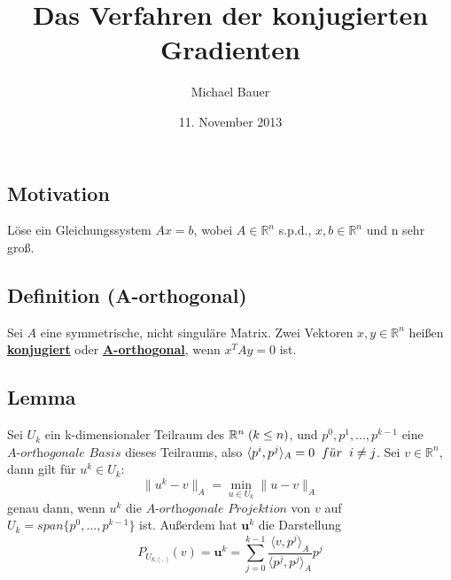 \documentclass{article}
\title{Das Verfahren der konjugierten Gradienten}
\author{Michael Bauer}
\date{11. November 2013}
\begin{document}
\maketitle

\section*{}

\subsection{Motivation}
Löse ein Gleichungssystem $Ax = b$, wobei $A\in\mathbb{R}^{n}$ s.p.d., $x, b\in\mathbb{R}^{n}$ und n sehr groß.

\subsection{Definition (A-orthogonal)}
Sei $A$ eine symmetrische, nicht singuläre Matrix. Zwei Vektoren $x,y \in \mathbb{R}^{n}$ heißen \underline{\textbf{konjugiert}} oder \underline{\textbf{A-orthogonal}}, wenn $x^{T}Ay = 0$ ist.

\subsection{Lemma}
Sei $U_{k}$ ein k-dimensionaler Teilraum des $\mathbb{R}^{n} \hspace{1mm} (k \le n)$, und $p^{0}, p^{1},...,p^{k-1}$ eine $\textit{A-orthogonale Basis}$ dieses Teilraums, also $\langle p^{i}, p^{j} \rangle _{A} = 0 \hspace{2mm} f\ddot{u}r \hspace{2mm} i \ne j$. Sei $v \in \mathbb{R}^{n}$, dann gilt für $u^{k} \in U_{k}$:
\begin{equation}
\|u^{k} - v\|_{A} = \underset{u \in U_{k}}{\min} \|u - v\|_{A}
\end{equation}
genau dann, wenn $u^{k}$ die $\textit{A-orthogonale Projektion}$ von $v$ auf $U_{k} = span\{p^{0},...,p^{k-1}\}$ ist. Außerdem hat $\textbf{u}^{k}$ die Darstellung
\begin{equation}
P_{U_{k,\langle \cdot,\cdot \rangle}}(v) = \textbf{u}^{k} = \sum_{j=0}^{k-1} \frac {\langle v, p^{j} \rangle _{A}} {\langle p^{j}, p^{j} \rangle _{A}} p^{j}
\end{equation}

\end{document}
